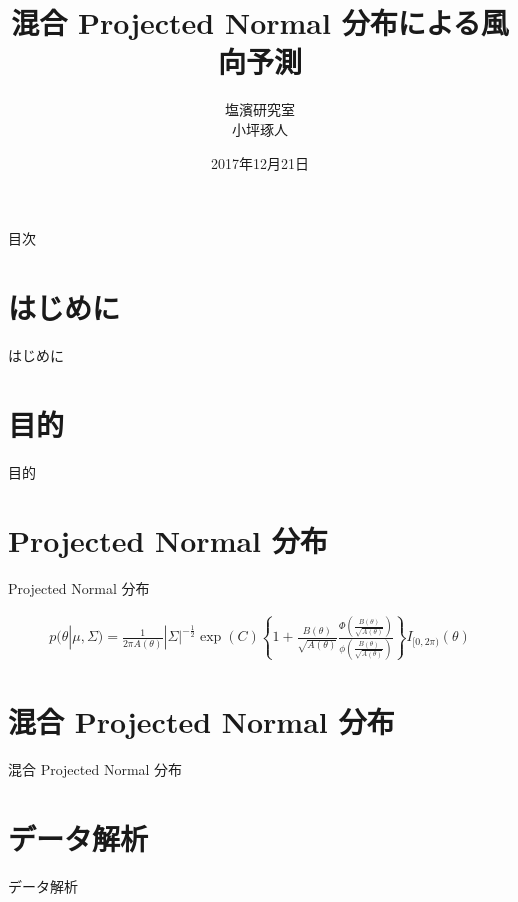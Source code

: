 \documentclass[dvipdfmx]{beamer}
\title[タイトル]{混合 Projected Normal 分布による風向予測}
\author[発表者名]{塩濱研究室\\ 小坪琢人}
\institute[所属]{東京理科大学\ 工学部経営工学科4年\\学籍番号 4414036}
\date[日付]{2017年12月21日}
\begin{document}
\begin{frame}[plain]
\titlepage
\end{frame}
	
\begin{frame}{目次}
\tableofcontents
\end{frame}

\section{はじめに}
\begin{frame}{はじめに}

\end{frame}

\section{目的}
\begin{frame}{目的}
\cite{GPN}
\end{frame}

\section{Projected Normal 分布}
\begin{frame}{Projected Normal 分布}

\begin{eqnarray}
\label{PNC}
p(\theta|\mu, \Sigma) = \frac{1}{2\pi A(\theta)}|\Sigma|^{-\frac{1}{2}}
\exp(C)\left\{1 + \frac{B(\theta)}{\sqrt{A(\theta)}} \frac{\Phi \left(\frac{B(\theta)}{\sqrt{A(\theta)}}\right)}{\phi \left(\frac{B(\theta)}{\sqrt{A(\theta)}}\right)}\right\} I_{[0,2\pi)}(\theta)
\end{eqnarray}

\end{frame}

\section{混合 Projected Normal 分布}
\begin{frame}{混合 Projected Normal 分布}

\end{frame}

\section{データ解析}
\begin{frame}{データ解析}

\end{frame}
\end{document}
